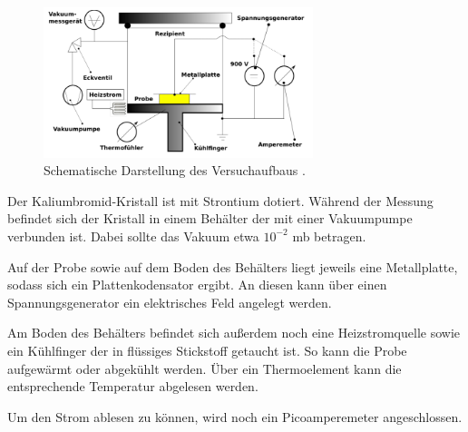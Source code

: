 \begin{figure}
\centering
\includegraphics[width=0.7\textwidth]{content/aufbau.png}
\caption{Schematische Darstellung des Versuchaufbaus \cite[3]{anleitung}.}
\label{fig:aufbau}
\end{figure}

Der Kaliumbromid-Kristall ist mit Strontium dotiert. Während der Messung befindet sich der Kristall in einem Behälter der mit einer Vakuumpumpe
verbunden ist. Dabei sollte das Vakuum etwa $10^{-2}$ mb betragen.

Auf der Probe sowie auf dem Boden des Behälters liegt jeweils eine Metallplatte, sodass sich ein Plattenkodensator
ergibt. An diesen kann über einen Spannungsgenerator ein elektrisches Feld angelegt werden.

Am Boden des Behälters befindet sich außerdem noch eine Heizstromquelle sowie ein Kühlfinger der in flüssiges Stickstoff
getaucht ist. So kann die Probe aufgewärmt oder abgekühlt werden. Über ein Thermoelement kann die entsprechende Temperatur
abgelesen werden.

Um den Strom ablesen zu können, wird noch ein Picoamperemeter angeschlossen.
